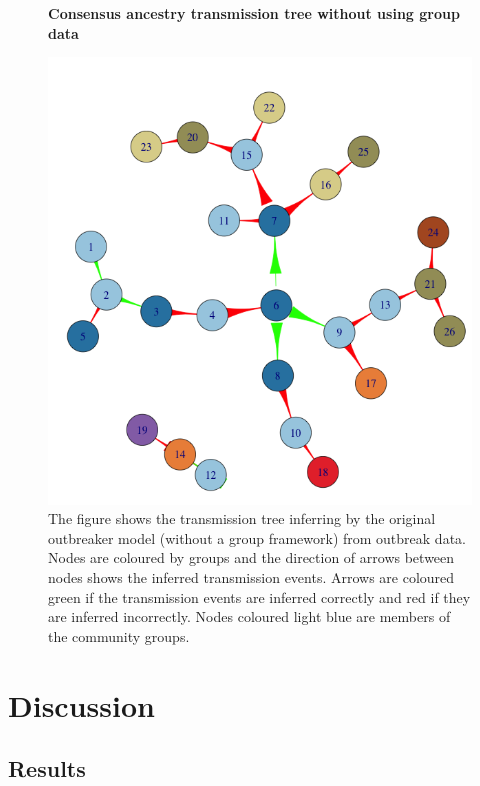 \documentclass[11pt,a4paper]{report}
\begin{document}
\begin{figure}[h!]
\centering
{\bf Consensus ancestry transmission tree without using group data}
\caption{The figure shows the transmission tree inferring by the original outbreaker model (without a group framework) from outbreak data. Nodes are coloured by groups and the direction of arrows between nodes shows the inferred transmission events. Arrows are coloured green if the transmission events are inferred correctly and red if they are inferred incorrectly. Nodes coloured light blue are members of the community groups.}
\includegraphics[scale=0.5]{tree_no_grps.png}
\end{figure}



\chapter{Discussion}
\section{Results}
\end{document}

